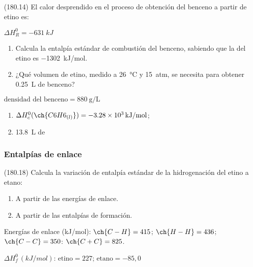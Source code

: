  \begin{exercise}[
      tags    = {},
      topics  = {química, termodinámica, termoquímica},
      source  = {FQ 1B MGH 2016, p180, e14},
    ]
    (180.14) El calor desprendido en el proceso de obtención del benceno a partir de etino es:

     \( \Delta H^0_R = \SI{-631}{kJ} \)

    \begin{enumerate}
      \item Calcula la entalpía estándar de combustión del benceno, sabiendo que la del etino es \SI{-1302}{kJ/mol}.
      \item ¿Qué volumen de etino, medido a \SI{26}{\celsius} y \SI{15}{atm}, se necesita para obtener \SI{0.25}{\liter} de benceno?
    \end{enumerate}

    \begin{gexdatos}
      \( \textrm{densidad del benceno} = \SI{880}{\gram\per\liter} \)
    \end{gexdatos}
  \end{exercise}

  \begin{solution}
    \begin{enumerate}
      \item \( \Delta H^0_c (\ch{C6H6_{(l)}}) = \SI{-3.28e3}{kJ/mol} \); \item \SI{13.8}{\liter} de 
    \end{enumerate}
  \end{solution}






  \subsubsection*{Entalpías de enlace}

  \begin{exercise}[
      tags    = {},
      topics  = {química, termodinámica, termoquímica},
      source  = {FQ 1B MGH 2016, p180, e18},
    ]
    (180.18) Calcula la variación de entalpía estándar de la hidrogenación del etino a etano:

    \begin{enumerate}
      \item A partir de las energías de enlace.
      \item A partir de las entalpías de formación.
    \end{enumerate}

    \begin{gexdatos}
      Energías de enlace (\si{kJ/mol}): \( \ch{C-H} = 415 \); \( \ch{H-H} = 436 \); \( \ch{C-C} = 350 \): \( \ch{C+C} = 825 \).

      \( \Delta H^0_f\,(\si{kJ/mol}) \): \( \textrm{etino} = 227 \); \( \textrm{etano} = -85,0 \)
    \end{gexdatos}
  \end{exercise}


